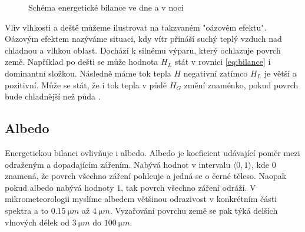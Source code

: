 \begin{figure}
\centering
\caption{Schéma energetické bilance ve dne a v noci}
\label{fig:schema}
\end{figure}

Vliv vlhkosti a deště můžeme ilustrovat na takzvaném "oázovém efektu". Oázovým efektem nazýváme situaci, kdy vítr přináší suchý teplý vzduch nad chladnou a vlhkou oblast. Dochází k silnému výparu, který ochlazuje povrch země. Například po dešti se může hodnota $H_L$ stát v rovnici \eqref{eq:bilance} i dominantní složkou. Následně máme tok tepla $H$ negativní zatímco $H_L$ je větší a pozitivní. Může se stát, že i tok tepla v půdě $H_G$ změní znaménko, pokud povrch bude chladnější než půda \parencite{arya2001}.

\subsection{Albedo}
Energetickou bilanci ovlivňuje i albedo. Albedo je koeficient udávající poměr mezi odraženým a dopadajícím zářením. Nabývá hodnot v intervalu $\langle 0,1\rangle$, kde $0$ znamená, že povrch všechno záření pohlcuje a jedná se o černé těleso. Naopak pokud albedo nabývá hodnoty $1$, tak povrch všechno záření odráží. V mikrometeorologii myslíme albedem většinou odrazivost v konkrétním části spektra a to $\SI{0.15}{\micro m}$ až $\SI{4}{\micro m}$. Vyzařování povrchu země se pak týká delších vlnových délek od $\SI{3}{\micro m}$ do $\SI{100}{\micro m}$. 

